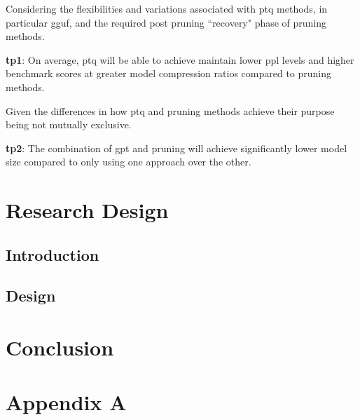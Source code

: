 \documentclass{ifacconf}
\begin{document}
	Considering the flexibilities and variations associated with \gls{ptq} methods, in particular \gls{gguf}, and the required post pruning ``recovery" phase of pruning methods.
	
	\textbf{\gls{tp}1}: On average, \gls{ptq} will be able to achieve maintain lower \gls{ppl} levels and higher benchmark scores at greater model compression ratios compared to pruning methods.
	
	Given the differences in how \gls{ptq} and pruning methods achieve their purpose being not mutually exclusive.
	
	\textbf{\gls{tp}2}: The combination of \gls{gpt} and pruning will achieve significantly lower model size compared to only using one approach over the other.
	
	
	\section{Research Design}
	\subsection{Introduction}
	\subsection{Design}
	
	\section{Conclusion}
	
	
	
	\printglossary[title={Glossary}]
	
	\appendix
	\section{Appendix A}
\end{document}
